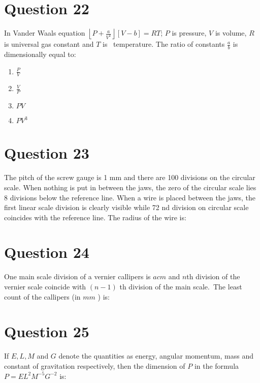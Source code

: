 \documentclass{article}
\begin{document}
\section*{Question 22}
In Vander Waals equation \(\left\lfloor P +\frac{ a }{ V ^2}\right\rfloor[ V - b ]= RT\); \(P\) is pressure, \(V\) is volume, \(R\) is universal gas constant and \(T\) is  temperature. The ratio of constants \(\frac{ a }{ b }\) is dimensionally equal to:
\begin{enumerate}[label=(\alph*)]
\item \(\frac{P}{V}\)
\item \(\frac{ V }{ P }\)
\item \(PV\)
\item \(PV ^3\)
\end{enumerate}
\newpage
\section*{Question 23}
The pitch of the screw gauge is 1 mm and there are 100 divisions on the circular scale. When nothing is put in between the jaws, the zero of the circular scale lies 8 divisions below the reference line. When a wire is placed between the jaws, the first linear scale division is clearly visible while 72 nd division on circular scale coincides with the reference line. The radius of the wire is: 
\begin{enumerate}[label=(\alph*)]
\end{enumerate}
\newpage
\section*{Question 24}
One main scale division of a vernier callipers is \(acm\) and \(n\)th division of the vernier scale coincide with \((n-1)\) th division of the main scale. The least count of the callipers (in \(mm\) ) is: 
\begin{enumerate}[label=(\alph*)]
\end{enumerate}
\newpage
\section*{Question 25}
If \(E , L , M\) and \(G\) denote the quantities as energy, angular momentum, mass and constant of gravitation respectively, then the dimension of \(P\) in the formula \(P = EL ^2 M ^{-5} G ^{-2}\) is: 
\begin{enumerate}[label=(\alph*)]
\end{enumerate}
\newpage
\end{document}
